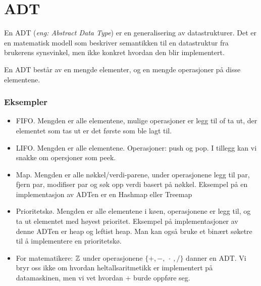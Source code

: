 \section{ADT}
En ADT (\textit{eng: Abstract Data Type}) er en generalisering av datastrukturer. Det er en matematisk modell som beskriver semantikken til en datastruktur fra brukerens synsvinkel, men ikke konkret hvordan den blir implementert. 

\begin{definition}
	En ADT består av en mengde elementer, og en mengde operasjoner på disse elementene. 
\end{definition}

\subsubsection{Eksempler}
\begin{itemize}
	\item FIFO. Mengden  er alle elementene, mulige operasjoner er legg til of ta ut, der elementet som tas ut er det første som ble lagt til.
	\item LIFO. Mengden er alle elementene. Operasjoner: push og pop. I tillegg kan vi snakke om opersjoner som peek.
	\item Map. Mengden er alle nøkkel/verdi-parene, under operasjonene legg til par, fjern par, modifiser par og søk opp verdi basert på nøkkel. Eksempel på en implementasjon av ADTen  er en Hashmap eller Treemap
	\item Prioritetskø. Mengden er alle elementene i køen, operasjonene er legg til, og ta ut elementet med høyest prioritet. Eksempel på implementasjoner av denne ADTen er heap og leftist heap. Man kan også bruke et binært søketre til å implementere en prioritetskø.
	\item For matematikere: $ \mathbb{Z} $ under operasjonene $ \{+, -, ~\cdot~, /\} $ danner en ADT. Vi bryr oss ikke om hvordan heltallsaritmetikk er implementert på datamaskinen, men vi vet hvordan $ + $ burde oppføre seg.
\end{itemize}
